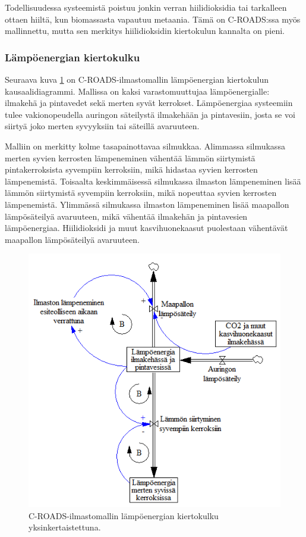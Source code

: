 \documentclass[finnish,12pt,a4paper,pdftex]{article}
\begin{document}
\begin{onehalfspacing}
Todellisuudessa systeemistä poistuu jonkin verran hiilidioksidia tai tarkalleen ottaen hiiltä, kun biomassasta vapautuu metaania. Tämä on C-ROADS:ssa myös mallinnettu, mutta sen merkitys hiilidioksidin kiertokulun kannalta on pieni. \cite{Croads}

\subsubsection*{Lämpöenergian kiertokulku \label{ilmasto:croads:lampo}}

Seuraava kuva \ref{ilmasto:lampo} on C-ROADS-ilmastomallin lämpöenergian kiertokulun kausaalidiagrammi. Mallissa on kaksi varastomuuttujaa lämpöenergialle: ilmakehä ja pintavedet sekä merten syvät kerrokset. Lämpöenergiaa systeemiin tulee vakionopeudella auringon säteilystä ilmakehään ja pintavesiin, josta se voi siirtyä joko merten syvyyksiin tai säteillä avaruuteen. \cite{Croads, CroadsFlightSimulator2011} 

Malliin on merkitty kolme tasapainottavaa silmukkaa. Alimmassa silmukassa merten syvien kerrosten lämpeneminen vähentää lämmön siirtymistä pintakerroksista syvempiin kerroksiin, mikä hidastaa syvien kerrosten lämpenemistä. Toisaalta keskimmäisessä silmukassa ilmaston lämpeneminen lisää lämmön siirtymistä syvempiin kerroksiin, mikä nopeuttaa syvien kerrosten lämpenemistä. Ylimmässä silmukassa ilmaston lämpeneminen lisää maapallon lämpösäteilyä avaruuteen, mikä vähentää ilmakehän ja pintavesien lämpöenergiaa. Hiilidioksidi ja muut kasvihuonekaasut puolestaan vähentävät maapallon lämpösäteilyä avaruuteen. \cite{Croads, CroadsFlightSimulator2011} 

\begin{figure}[H]
\centering \includegraphics{c-roads-lampo}
\caption{C-ROADS-ilmastomallin lämpöenergian kiertokulku yksinkertaistettuna. \cite{Croads} \label{ilmasto:lampo}}
\end{figure}


\end{onehalfspacing}
\end{document}
